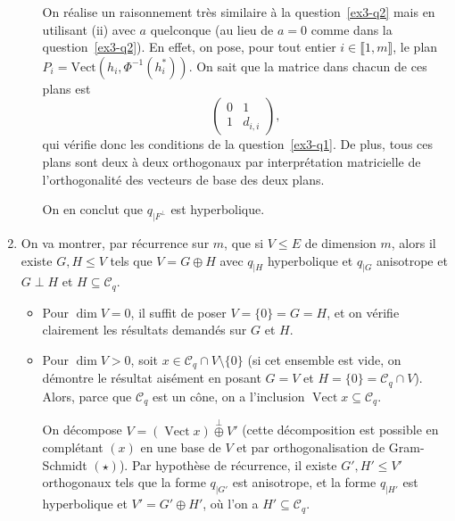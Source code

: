 \documentclass{../../td}
\begin{document}
\begin{enumerate}
\begin{enumerate}
          On réalise un raisonnement très similaire à la question~\ref{ex3-q2} mais en utilisant (ii) avec $a$ quelconque (au lieu de $a = 0$ comme dans la question~\ref{ex3-q2}).
          En effet, on pose, pour tout entier $i \in \llbracket 1,m\rrbracket$, le plan $P_i = \mathrm{Vect}(h_i, \Phi ^{-1}(h_i^*))$.
          On sait que la matrice dans chacun de ces plans est \[
            \begin{pmatrix} 0 & 1\\ 1 & d_{i,i} \end{pmatrix}
          ,\] qui vérifie donc les conditions de la question~\ref{ex3-q1}.
          De plus, tous ces plans sont deux à deux orthogonaux par interprétation matricielle de l'orthogonalité des vecteurs de base des deux plans.

          On en conclut que $q_{|F^\perp}$ est hyperbolique.
      \end{enumerate}
    \item On va montrer, par récurrence sur $m$, que si $V \le E$ de dimension $m$, alors il existe $G,H \le V$ tels que $V = G \oplus H$ avec $q_{|H}$ hyperbolique et $q_{|G}$ anisotrope et $G \perp H$ et $H \subseteq \mathcal{C}_q$.
      \begin{itemize}
        \item Pour $\dim V = 0$, il suffit de poser $V = \{0\} = G = H$, et on vérifie clairement les résultats demandés sur $G$ et $H$.
        \item Pour $\dim V > 0$, soit $x \in \mathcal{C}_q \cap V \setminus \{0\}$ (si cet ensemble est vide, on démontre le résultat aisément en posant $G = V$ et $H = \{0\} = \mathcal{C}_q \cap V$).
          Alors, parce que $\mathcal{C}_q$ est un cône, on a l'inclusion $\operatorname{Vect} x \subseteq \mathcal{C}_q$.

          On décompose $V = (\operatorname{Vect} x)\overset \perp \oplus V'$ (cette décomposition est possible en complétant $(x)$ en une base de $V$ et par orthogonalisation de Gram-Schmidt $(\star)$).
          Par hypothèse de récurrence, il existe $G',H' \le V'$ orthogonaux tels que la forme $q_{|G'}$ est anisotrope, et la forme $q_{|H'}$ est hyperbolique et $V' = G' \oplus H'$, où l'on a $H' \subseteq \mathcal{C}_q$.


\end{itemize}
\end{enumerate}
\end{document}
